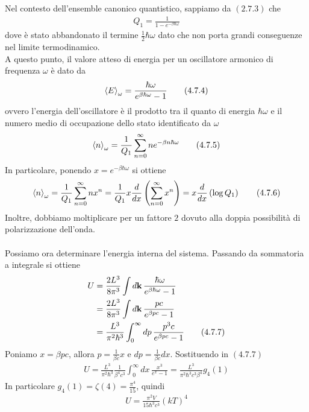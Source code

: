 \documentclass{article}
\begin{document}
Nel contesto dell'ensemble canonico quantistico, sappiamo da $(2.7.3)$ che 
\begin{align}
    Q_1 = \frac{1}{1 - e^{-\beta\hbar\omega}} \tag{4.7.3}
\end{align}
dove è stato abbandonato il termine $\frac{1}{2}\hbar\omega$ dato che non porta grandi conseguenze nel limite termodinamico. \\
A questo punto, il valore atteso di energia per un oscillatore armonico di frequenza $\omega$ è dato da
\begin{align}
    \braket{E}_\omega = \frac{\hbar\omega}{e^{\beta\hbar\omega} - 1} \tag{4.7.4}
\end{align}
ovvero l'energia dell'oscillatore è il prodotto tra il quanto di energia $\hbar\omega$ e il numero medio di occupazione dello stato identificato da $\omega$
\begin{align}
    \braket{n}_\omega = \frac{1}{Q_1}\sum_{n = 0}^\infty ne^{-\beta n\hbar\omega} \tag{4.7.5}
\end{align}
In particolare, ponendo $x = e^{-\beta\hbar\omega}$ si ottiene
\begin{align}
    \braket{n}_\omega = \frac{1}{Q_1}\sum_{n = 0}^\infty nx^n = \frac{1}{Q_1}x\frac{d}{dx}\left(\sum_{n = 0}^\infty x^n\right) = x\frac{d}{dx}\left(\log Q_1\right) \tag{4.7.6}
\end{align}
Inoltre, dobbiamo moltiplicare per un fattore $2$ dovuto alla doppia possibilità di polarizzazione dell'onda. \\ \\
Possiamo ora determinare l'energia interna del sistema. Passando da sommatoria a integrale si ottiene
\begin{align}
    U &= \frac{2L^3}{8\pi^3}\int d\mathbf{k} \, \frac{\hbar\omega}{e^{\beta\hbar\omega} - 1} \notag \\
    &= \frac{2L^3}{8\pi^3}\int d\mathbf{k} \, \frac{pc}{e^{\beta pc} - 1} \notag \\
    &= \frac{L^3}{\pi^2\hbar^3}\int_0^\infty dp \, \frac{p^3c}{e^{\beta pc} - 1} \tag{4.7.7}
\end{align}
Poniamo $x = \beta pc$, allora $p = \frac{1}{\beta c}x$ e $dp = \frac{1}{\beta c}dx$. Sostituendo in $(4.7.7)$
\begin{align}
    U = \frac{L^3}{\pi^2\hbar^3}\frac{1}{\beta^4c^3}\int_0^\infty dx \, \frac{x^3}{e^x - 1} = \frac{L^3}{\pi^2\hbar^3c^3\beta^4}g_4(1) \tag{4.7.8}
\end{align}
In particolare $g_4(1) = \zeta(4) = \frac{\pi^4}{15}$, quindi
\begin{align}
    U = \frac{\pi^2V}{15\hbar^3c^3}(kT)^4 \tag{4.7.9}
\end{align}
\end{document}
